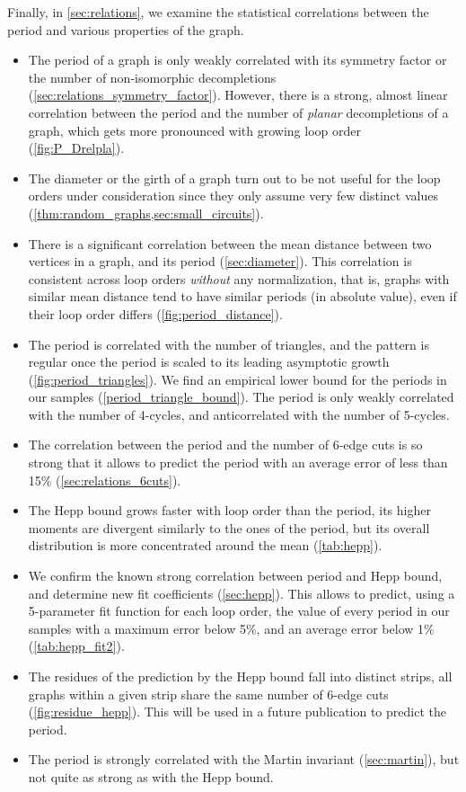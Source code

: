 \documentclass[11pt,a4paper]{article}
\renewcommand{\|}{\rule[-0.4ex]{0.2ex}{1.2em}}
\begin{document}
\noindent
Finally, in \cref{sec:relations}, we examine the statistical correlations between the period and various properties of the graph.
\begin{itemize}
	\item The period of a graph is only weakly correlated with its symmetry factor or the number of non-isomorphic decompletions (\cref{sec:relations_symmetry_factor}). However, there is a strong, almost linear correlation between the period and the number of \emph{planar} decompletions of a graph, which gets more pronounced with growing loop order (\cref{fig:P_Drelpla}).
	\item The diameter or the girth of a graph turn out to be not useful for the loop orders under consideration since they only assume very few distinct values (\cref{thm:random_graphs,sec:small_circuits}).
	\item  There is a significant correlation between the mean distance between two vertices in a graph, and its period (\cref{sec:diameter}). This correlation is consistent across loop orders \emph{without} any normalization, that is, graphs with similar mean distance tend to have similar periods (in absolute value), even if their loop order differs (\cref{fig:period_distance}).
	\item The period is correlated with the number of triangles, and the pattern is regular once the period is scaled to its leading asymptotic growth (\cref{fig:period_triangles}). We find an empirical lower bound for the periods in our samples (\cref{period_triangle_bound}). The period is only weakly correlated with the number of 4-cycles, and anticorrelated with the number of 5-cycles. 
	\item The correlation between the period and the number of 6-edge cuts is so strong that it allows to predict the period with an average error of less than 15\% (\cref{sec:relations_6cuts}).
	\item The Hepp bound grows faster with loop order than the period,  its higher moments are divergent similarly to the ones of the period, but its overall distribution is more concentrated around the mean (\cref{tab:hepp}).
	\item We confirm the known strong correlation between period and Hepp bound, and determine new fit coefficients (\cref{sec:hepp}). This allows to predict, using a 5-parameter fit function for each loop order, the value of every period in our samples with a maximum error below 5\%, and an average error below 1\% (\cref{tab:hepp_fit2}). 
	\item The residues of the prediction by the Hepp bound fall into distinct strips, all graphs within a given strip share the same number of 6-edge cuts (\cref{fig:residue_hepp}). This will be used in a future publication to predict the period.
	\item The period is strongly correlated with the Martin invariant (\cref{sec:martin}), but not quite as strong as with the Hepp bound.
\end{itemize}
\end{document}
